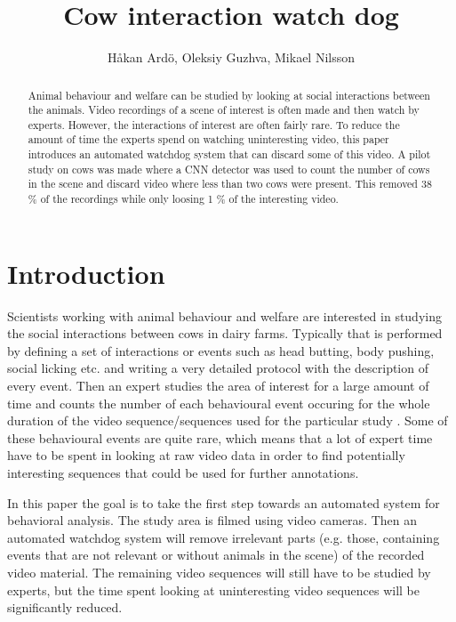 \documentclass[10pt,a4paper,twocolumn]{article}
\author{Håkan Ardö, Oleksiy Guzhva, Mikael Nilsson}
\title{Cow interaction watch dog}
\begin{document}
\maketitle

\begin{abstract}
Animal behaviour and welfare can be studied by looking at social interactions between the animals. Video recordings of a scene of interest is often made and then watch by experts. However, the  interactions of interest are often fairly rare. To reduce the amount of time the experts spend on watching uninteresting video, this paper introduces an automated watchdog system that can discard some of this video. A pilot study on cows was made where a CNN detector was used to count the number of cows in the scene and discard video where less than two cows were present. This removed 38 \% of the recordings while only loosing 1 \% of the interesting video.


\end{abstract}

\section{Introduction}

Scientists working with animal behaviour and welfare are interested in studying the social interactions between cows in dairy farms. Typically that is performed by defining a set of interactions or events such as head butting, body pushing, social licking etc. and writing a very detailed protocol with the description of every event. Then an expert studies the area of interest for a large amount of time and counts the number of each behavioural event occuring for the whole duration of the video sequence/sequences used for the particular study \cite{MartinandBateson2007}. Some of these behavioural events are quite rare, which means that a lot of expert time have to be spent in looking at raw video data in order to find potentially interesting sequences that could be used for further annotations.

In this paper the goal is to take the first step towards an automated system for behavioral analysis. The study area is filmed using video cameras. Then an automated watchdog system will remove irrelevant parts (e.g. those, containing events that are not relevant or without animals in the scene) of the recorded video material. The remaining video sequences will still have to be studied by experts, but the time spent looking at uninteresting video sequences will be significantly reduced.
\end{document}
